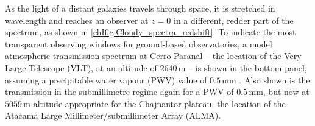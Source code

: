 As the light of a distant galaxies travels through space, it is stretched in wavelength and reaches an observer at $z = 0$ in a different, redder part of the spectrum, as shown in \cref{chIfig:Cloudy_spectra_redshift}. To indicate the most transparent observing windows for ground-based observatories, a model atmospheric transmission spectrum at Cerro Paranal -- the location of the Very Large Telescope (VLT), at an altitude of $2640 \, \mathrm{m}$ -- is shown in the bottom panel, assuming a precipitable water vapour (PWV) value of $0.5 \, \mathrm{mm}$ \citep{2012A&A...543A..92N, 2013A&A...560A..91J}. Also shown is the transmission in the submillimetre regime \citep{2001ITAP...49.1683P} again for a PWV of $0.5 \, \mathrm{mm}$, but now at $5059 \, \mathrm{m}$ altitude appropriate for the Chajnantor plateau, the location of the Atacama Large Millimeter/submillimeter Array (ALMA).
